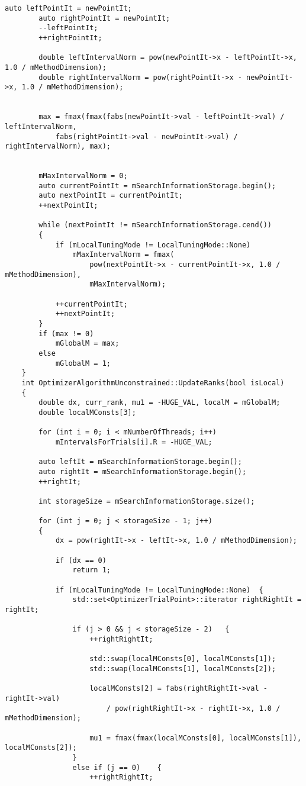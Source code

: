 \begin{lstlisting}[frame=single]
		auto leftPointIt = newPointIt;
		auto rightPointIt = newPointIt;
		--leftPointIt;
		++rightPointIt;

		double leftIntervalNorm = pow(newPointIt->x - leftPointIt->x, 1.0 / mMethodDimension);
		double rightIntervalNorm = pow(rightPointIt->x - newPointIt->x, 1.0 / mMethodDimension);


		max = fmax(fmax(fabs(newPointIt->val - leftPointIt->val) / leftIntervalNorm,
			fabs(rightPointIt->val - newPointIt->val) /	rightIntervalNorm), max);


		mMaxIntervalNorm = 0;
		auto currentPointIt = mSearchInformationStorage.begin();
		auto nextPointIt = currentPointIt;
		++nextPointIt;

		while (nextPointIt != mSearchInformationStorage.cend())
		{
			if (mLocalTuningMode != LocalTuningMode::None)
				mMaxIntervalNorm = fmax(
					pow(nextPointIt->x - currentPointIt->x, 1.0 / mMethodDimension),
					mMaxIntervalNorm);

			++currentPointIt;
			++nextPointIt;
		}
		if (max != 0)
			mGlobalM = max;
		else
			mGlobalM = 1;
	}
	int OptimizerAlgorithmUnconstrained::UpdateRanks(bool isLocal)
	{
		double dx, curr_rank, mu1 = -HUGE_VAL, localM = mGlobalM;
		double localMConsts[3];

		for (int i = 0; i < mNumberOfThreads; i++)
			mIntervalsForTrials[i].R = -HUGE_VAL;

		auto leftIt = mSearchInformationStorage.begin();
		auto rightIt = mSearchInformationStorage.begin();
		++rightIt;

		int storageSize = mSearchInformationStorage.size();

		for (int j = 0; j < storageSize - 1; j++)
		{
			dx = pow(rightIt->x - leftIt->x, 1.0 / mMethodDimension);

			if (dx == 0)
				return 1;

			if (mLocalTuningMode != LocalTuningMode::None)	{
				std::set<OptimizerTrialPoint>::iterator rightRightIt = rightIt;

				if (j > 0 && j < storageSize - 2)	{
					++rightRightIt;

					std::swap(localMConsts[0], localMConsts[1]);
					std::swap(localMConsts[1], localMConsts[2]);

					localMConsts[2] = fabs(rightRightIt->val - rightIt->val)
						/ pow(rightRightIt->x - rightIt->x, 1.0 / mMethodDimension);

					mu1 = fmax(fmax(localMConsts[0], localMConsts[1]), localMConsts[2]);
				}
				else if (j == 0)	{
					++rightRightIt;


\end{lstlisting}
